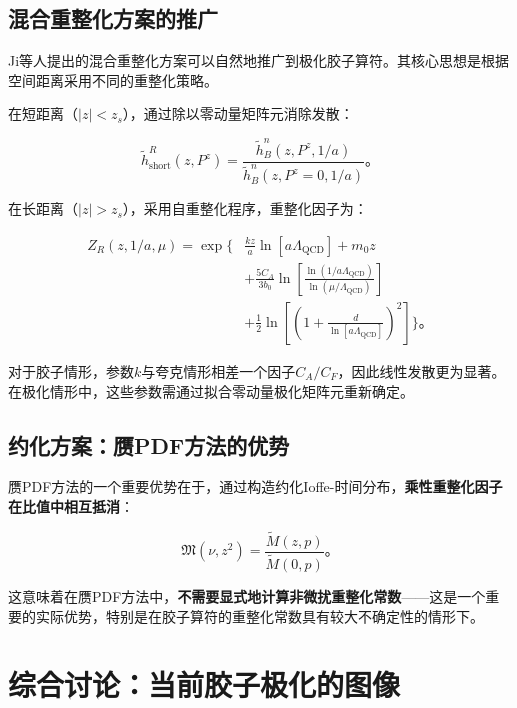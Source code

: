 \documentclass[12pt,a4paper]{ctexart}
\theoremstyle{definition}
\begin{document}
\subsection{混合重整化方案的推广}

Ji等人提出的混合重整化方案\cite{Ji2021hybrid}可以自然地推广到极化胶子算符。其核心思想是根据空间距离采用不同的重整化策略。

在短距离（$|z| < z_s$），通过除以零动量矩阵元消除发散：

\begin{equation}
\tilde{h}^R_{\text{short}}(z, P^z) = \frac{\tilde{h}^n_B(z, P^z, 1/a)}{\tilde{h}^n_B(z, P^z=0, 1/a)}。
\end{equation}

在长距离（$|z| > z_s$），采用自重整化程序，重整化因子为\cite{Chen2025gluon}：

\begin{equation}
\begin{aligned}
Z_R(z, 1/a, \mu) = \exp\Bigg\{&\frac{kz}{a}\ln[a\Lambda_{\text{QCD}}] + m_0 z \\
&+ \frac{5C_A}{3b_0} \ln\left[\frac{\ln(1/a\Lambda_{\text{QCD}})}{\ln(\mu/\Lambda_{\text{QCD}})}\right] \\
&+ \frac{1}{2}\ln\left[\left(1 + \frac{d}{\ln[a\Lambda_{\text{QCD}}]}\right)^2\right]\Bigg\}。
\end{aligned}
\label{eq:ZR_polarized}
\end{equation}

对于胶子情形，参数$k$与夸克情形相差一个因子$C_A/C_F$，因此线性发散更为显著\cite{Chen2025gluon}。在极化情形中，这些参数需通过拟合零动量极化矩阵元重新确定。

\subsection{约化方案：赝PDF方法的优势}

赝PDF方法的一个重要优势在于，通过构造约化Ioffe-时间分布，\textbf{乘性重整化因子在比值中相互抵消}\cite{Egerer2022}：

\begin{equation}
\mathfrak{M}(\nu, z^2) = \frac{\tilde{M}(z,p)}{\tilde{M}(0,p)}。
\label{eq:ratio_cancellation}
\end{equation}

这意味着在赝PDF方法中，\textbf{不需要显式地计算非微扰重整化常数}——这是一个重要的实际优势，特别是在胶子算符的重整化常数具有较大不确定性的情形下。

\section{综合讨论：当前胶子极化的图像}
\end{document}
